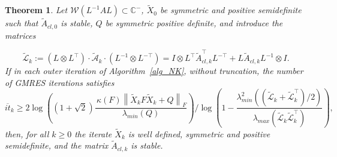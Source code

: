 \documentclass[a4paper,10pt]{article}
\newcommand{\norm}[1]{\left\lVert#1\right\rVert}
\newtheorem{theorem}[definition]{Theorem}
\newcommand{\upd}[1]{{\color{black}#1}} %
\begin{document}
\begin{theorem}\label{thm:GMRESstable}
Let $\mathcal{W}(L^{-1}A L) \subset \mathbb{C}^{-}$, $\tilde{X}_0$ be symmetric and positive semidefinite such that $\tilde{A}_{cl,0}$ is stable,  $Q$ be symmetric positive definite, and introduce the matrices %

$$\tilde{\mathcal L}_k:=(L\otimes L^\top)\cdot \tilde{\mathcal A}_k\cdot(L^{-1}\otimes L^{-\top})=I \otimes L^\top\tilde{A}_{cl,k}^\top L^{-\top} + L \tilde{A}_{cl,k} L^{-1} \otimes I .$$
 If in each outer iteration of Algorithm~\ref{alg_NK}, without truncation, the number of GMRES  iterations satisfies
\begin{equation}
	\overline{it}_k \ge 2 \log\left((1+\sqrt{2})\frac{\, \kappa(F)\norm{ \tilde{X}_kF\tilde{X}_k+Q }_F }{\lambda_{min}(Q)}\right)\bigg/ \log\left(1 - \frac{\lambda^2_{min}((\tilde{\mathcal{L}}_{k}+\tilde{\mathcal{L}}_{k}^\top)/2)}{\lambda_{max}(\tilde{\mathcal{L}}_{k}\tilde{\mathcal{L}}_{k}^\top)} \right),
	\label{n_iter}
\end{equation}	
 then\upd{,} for all $k\ge 0$ the iterate $\widetilde X_{k}$  is well defined, symmetric and positive semidefinite,
and  the matrix $\widetilde {A}_{cl,k}$ is stable.
	
\end{theorem}
\end{document}
